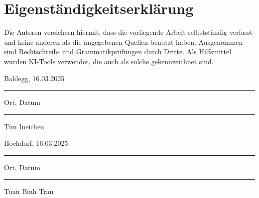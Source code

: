\newpage
\section*{Eigenständigkeitserklärung}

Die Autoren versichern hiermit, dass die vorliegende Arbeit selbstständig verfasst und keine anderen als die angegebenen Quellen benutzt haben. 
Ausgenommen sind Rechtschreib- und Grammatikprüfungen durch Dritte. Als Hilfsmittel wurden KI-Tools verwendet, die auch als solche gekennzeichnet sind.


\vspace{2cm}

\begin{minipage}[t]{0.45\textwidth}
    Baldegg, 16.03.2025

    \noindent\rule{4cm}{0.4pt}

    Ort, Datum
\end{minipage}
\begin{minipage}[t]{0.45\textwidth}
    \rule{0cm}{0pt}

    \noindent\rule{5cm}{0.4pt}

    Tim Ineichen
\end{minipage}

\vspace{2cm}

\begin{minipage}[t]{0.45\textwidth}
    Hochdorf, 16.03.2025

    \noindent\rule{4cm}{0.4pt}

    Ort, Datum
\end{minipage}
\begin{minipage}[t]{0.45\textwidth}
    \rule{0cm}{0pt}

    \noindent\rule{5cm}{0.4pt}
    
    Tuan Binh Tran
\end{minipage}

\newpage